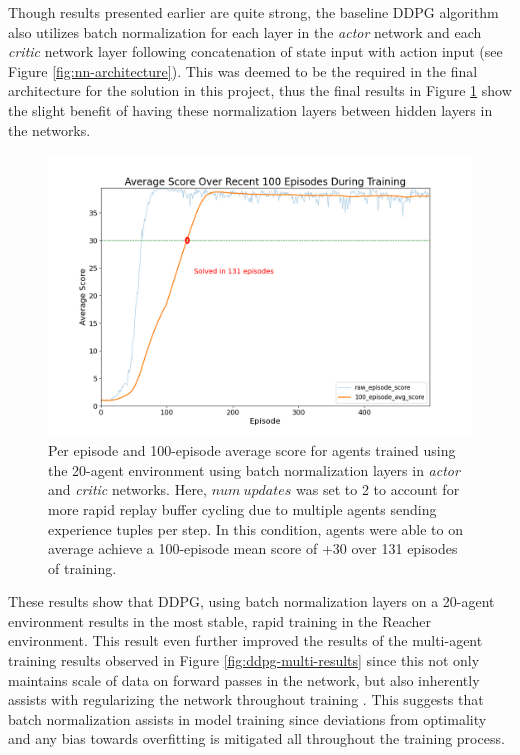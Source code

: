 \documentclass[11pt]{article}
\begin{document}
Though results presented earlier are quite strong, the baseline DDPG algorithm also utilizes batch normalization for each layer in the \textit{actor} network and each \textit{critic} network layer following concatenation of state input with action input (see Figure \ref{fig:nn-architecture}). This was deemed to be the required in the final architecture for the solution in this project, thus the final results in Figure \ref{fig:ddpg-multi-batch-results} show the slight benefit of having these normalization layers between hidden layers in the networks.

\FloatBarrier

\begin{figure}[!ht]
	\centering
	\includegraphics[width=0.9\linewidth]{images/ddpg-multi-batch-results.png}
	\caption{Per episode and 100-episode average score for agents trained using the 20-agent environment using batch normalization layers in \textit{actor} and \textit{critic} networks. Here, $num\ updates$ was set to 2 to account for more rapid replay buffer cycling due to multiple agents sending experience tuples per step. In this condition, agents were able to on average achieve a 100-episode mean score of +30 over 131 episodes of training.}
	\label{fig:ddpg-multi-batch-results}
\end{figure}

\FloatBarrier

These results show that DDPG, using batch normalization layers on a 20-agent environment results in the most stable, rapid training in the Reacher environment. This result even further improved the results of the multi-agent training results observed in Figure \ref{fig:ddpg-multi-results} since this not only maintains scale of data on forward passes in the network, but also inherently assists with regularizing the network throughout training \cite{batch}. This suggests that batch normalization assists in model training since deviations from optimality and any bias towards overfitting is mitigated all throughout the training process.
\end{document}
